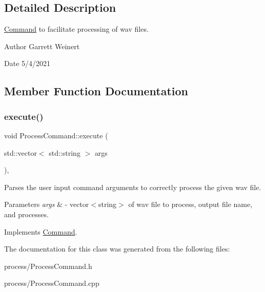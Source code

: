 \subsection{Detailed Description}
\hyperlink{classCommand}{Command} to facilitate processing of wav files. \begin{DoxyAuthor}{Author}
Garrett Weinert 
\end{DoxyAuthor}
\begin{DoxyDate}{Date}
5/4/2021 
\end{DoxyDate}


\subsection{Member Function Documentation}
\mbox{\label{classProcessCommand_a2a1eda1ad6ea134baf1dcc19a0966222}} 
\subsubsection{\texorpdfstring{execute()}{execute()}}
{\footnotesize\ttfamily void Process\+Command\+::execute (\begin{DoxyParamCaption}\item[{std\+::vector$<$ std\+::string $>$}]{args }\end{DoxyParamCaption})\hspace{0.3cm}{\ttfamily [override]}, {\ttfamily [virtual]}}

Parses the user input command arguments to correctly process the given wav file. 
\begin{DoxyParams}{Parameters}
{\em args} & -\/ vector$<$string$>$ of wav file to process, output file name, and processes. \\
\hline
\end{DoxyParams}


Implements \hyperlink{classCommand}{Command}.



The documentation for this class was generated from the following files\+:\begin{DoxyCompactItemize}
\item 
process/Process\+Command.\+h\item 
process/Process\+Command.\+cpp\end{DoxyCompactItemize}
